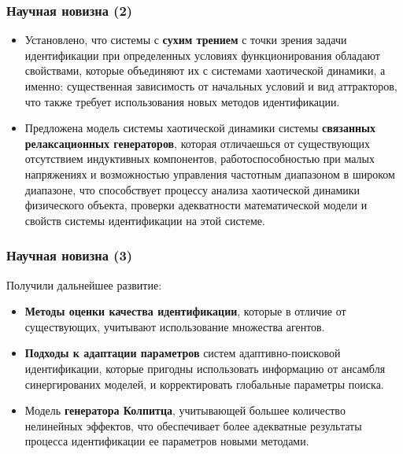 \documentclass[14pt,handout,utf8]{beamer}
\begin{document}
\begin{frame}
  \frametitle{Научная новизна (2)}

  \begin{itemize}

    \item
      Установлено, что системы с \textbf{сухим трением} с точки зрения задачи идентификации при
      определенных условиях функционирования обладают свойствами, которые объединяют их с
      системами хаотической динамики, а именно:
      существенная зависимость от начальных условий и вид аттракторов, что
      также требует использования новых методов идентификации.

    \item
      Предложена модель системы хаотической динамики системы
      \textbf{связанных релаксационных генераторов},
      которая отличаешься от существующих отсутствием индуктивных
      компонентов, работоспособностью при малых напряжениях и возможностью управления
      частотным диапазоном в широком диапазоне, что способствует процессу анализа
      хаотической динамики физического объекта, проверки адекватности математической
      модели и свойств системы идентификации на этой системе.

  \end{itemize}

\end{frame}




\begin{frame}
  \frametitle{Научная новизна (3)}

\noindent
Получили дальнейшее развитие:

  \begin{itemize}

    \item
      \textbf{Методы оценки качества идентификации},
      которые в отличие от существующих,
      учитывают использование множества агентов.

    \item
      \textbf{Подходы к адаптации параметров}
      систем адаптивно-поисковой идентификации,
      которые пригодны использовать информацию от ансамбля синергированих моделей, и
      корректировать глобальные параметры поиска.

    \item
      Модель \textbf{генератора Колпитца}, учитывающей большее количество нелинейных эффектов,
      что обеспечивает более адекватные результаты процесса идентификации ее
      параметров новыми методами.

  \end{itemize}


\end{frame}
\end{document}
